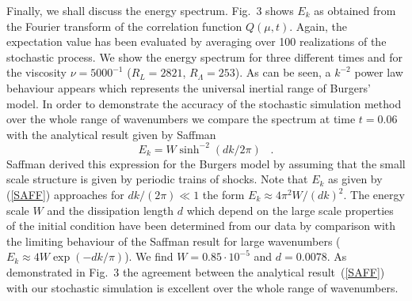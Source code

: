 Finally, we shall discuss the energy spectrum.
Fig.~3 shows $E_{k}$ as
obtained from the Fourier transform of the correlation
function $Q(\mu,t)$.
Again, the expectation value has been evaluated by averaging
over 100
realizations of the stochastic process. We show the energy
spectrum for
three different times and for the viscosity $\nu = 5000^{-1}$
($R_{L}= 2821$, $R_{\Lambda}= 253$). As can be seen,
a $k^{-2}$ power law behaviour appears which
represents the universal inertial range of Burgers' model.
In order to demonstrate the accuracy of the stochastic
simulation method
over the whole range of wavenumbers we compare the spectrum at time
$t=0.06$ with the analytical result given by Saffman\cite{SAFFMAN}
\begin{equation}        \label{SAFF}
E_{k} = W \sinh^{-2}(dk/2\pi) \;\;\; .
\end{equation}
Saffman derived this expression for the Burgers model by assuming
that
the small scale structure is given by periodic trains of shocks.
Note that
$E_{k}$ as given by (\ref{SAFF}) approaches for
$dk/(2 \pi) \ll 1$ the form
$E_{k} \approx 4\pi^2 W/(dk)^2$. The energy
scale $W$ and the dissipation length $d$ which depend on the
large scale properties of the initial condition have been
determined from
our data by comparison with the limiting behaviour of the
Saffman result
for large wavenumbers
($E_{k} \approx 4W \exp (-dk/\pi)$). We find
$W=0.85\cdot 10^{-5}$ and
$d=0.0078$. As demonstrated in Fig.~3 the agreement between the
analytical result~(\ref{SAFF}) with our stochastic simulation is
excellent over the whole range of wavenumbers.















